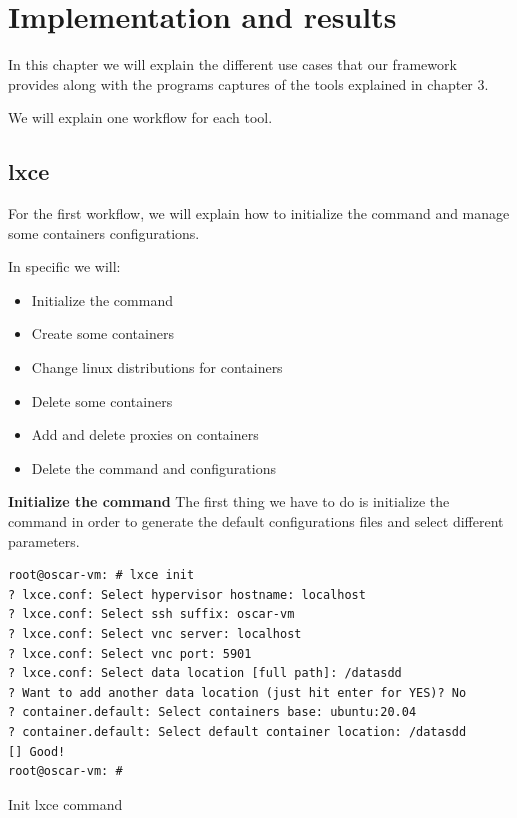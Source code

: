 \clearpage\section{Implementation and results}

In this chapter we will explain the different use cases that our framework provides along with the programs captures of the tools explained in chapter 3.

We will explain one workflow for each tool.

\subsection{lxce}
For the first workflow, we will explain how to initialize the command and manage some containers configurations.

In specific we will:
\begin{itemize}
	\item{Initialize the command}
	\item{Create some containers}
	\item{Change linux distributions for containers}
	\item{Delete some containers}
	\item{Add and delete proxies on containers}
	\item{Delete the command and configurations}
\end{itemize}

\textbf{Initialize the command}
The first thing we have to do is initialize the command in order to generate the default configurations files and select different parameters.

\begin{listing}[H]
\begin{verbatim}
root@oscar-vm: # lxce init
? lxce.conf: Select hypervisor hostname: localhost
? lxce.conf: Select ssh suffix: oscar-vm
? lxce.conf: Select vnc server: localhost
? lxce.conf: Select vnc port: 5901
? lxce.conf: Select data location [full path]: /datasdd
? Want to add another data location (just hit enter for YES)? No
? container.default: Select containers base: ubuntu:20.04
? container.default: Select default container location: /datasdd
[] Good!
root@oscar-vm: #
\end{verbatim}
	\label{fig:Web admin architecture}
	\caption[lxce init]{\footnotesize{Init lxce command}}
\end{listing}

